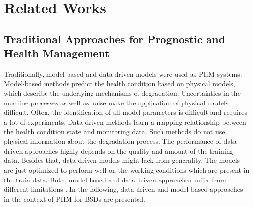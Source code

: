 
\chapter{Related Works}\label{chapter:related_works}


\section{Traditional Approaches for Prognostic and Health Management}

Traditionally, model-based and data-driven models were used as PHM systems. Model-based methods predict the health condition based on physical models, which describe the underlying mechanisms of degradation. Uncertainties in the machine processes as well as noise make the application of physical models difficult. Often, the identification of all model parameters is difficult and requires a lot of experiments. Data-driven methods learn a mapping relationship between the health condition state and monitoring data. Such methods do not use physical information about the degradation process. The performance of data-driven approaches highly depends on the quality and amount of the training data. Besides that, data-driven models might lack from generality. The models are just optimized to perform well on the working conditions which are present in the train data. Both, model-based and data-driven approaches suffer from different limitations \cite{DENG2020}. In the following, data-driven and model-based approaches in the context of PHM for BSDs are presented. 

